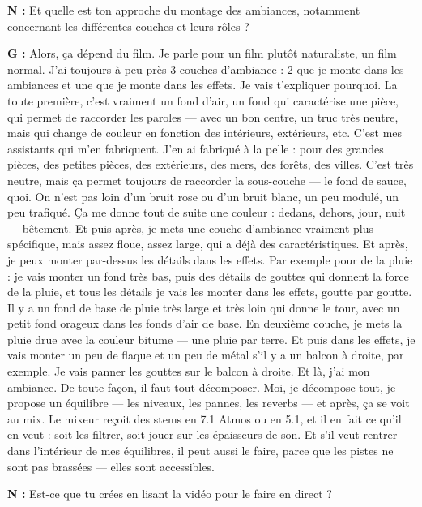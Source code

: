 ﻿\documentclass[12pt]{article}
\begin{document}
\textbf{N :} Et quelle est ton approche du montage des ambiances, notamment concernant les différentes couches et leurs rôles ?

\textbf{G :} Alors, ça dépend du film. Je parle pour un film plutôt naturaliste, un film normal. J'ai toujours à peu près 3 couches d'ambiance : 2 que je monte dans les ambiances et une que je monte dans les effets. Je vais t'expliquer pourquoi. La toute première, c'est vraiment un fond d'air, un fond qui caractérise une pièce, qui permet de raccorder les paroles — avec un bon centre, un truc très neutre, mais qui change de couleur en fonction des intérieurs, extérieurs, etc. C'est mes assistants qui m'en fabriquent. J'en ai fabriqué à la pelle : pour des grandes pièces, des petites pièces, des extérieurs, des mers, des forêts, des villes. C'est très neutre, mais ça permet toujours de raccorder la sous-couche — le fond de sauce, quoi. On n'est pas loin d'un bruit rose ou d'un bruit blanc, un peu modulé, un peu trafiqué. Ça me donne tout de suite une couleur : dedans, dehors, jour, nuit — bêtement. Et puis après, je mets une couche d'ambiance vraiment plus spécifique, mais assez floue, assez large, qui a déjà des caractéristiques. Et après, je peux monter par-dessus les détails dans les effets. Par exemple pour de la pluie : je vais monter un fond très bas, puis des détails de gouttes qui donnent la force de la pluie, et tous les détails je vais les monter dans les effets, goutte par goutte. Il y a un fond de base de pluie très large et très loin qui donne le tour, avec un petit fond orageux dans les fonds d'air de base. En deuxième couche, je mets la pluie drue avec la couleur bitume — une pluie par terre. Et puis dans les effets, je vais monter un peu de flaque et un peu de métal s'il y a un balcon à droite, par exemple. Je vais panner les gouttes sur le balcon à droite. Et là, j'ai mon ambiance. De toute façon, il faut tout décomposer. Moi, je décompose tout, je propose un équilibre — les niveaux, les pannes, les reverbs — et après, ça se voit au mix. Le mixeur reçoit des stems en 7.1 Atmos ou en 5.1, et il en fait ce qu'il en veut : soit les filtrer, soit jouer sur les épaisseurs de son. Et s'il veut rentrer dans l'intérieur de mes équilibres, il peut aussi le faire, parce que les pistes ne sont pas brassées — elles sont accessibles.

\textbf{N :} Est-ce que tu crées en lisant la vidéo pour le faire en direct ?
\end{document}
